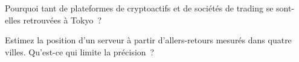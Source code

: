 \begin{interviewq}\label{iq:nw:where-the-crypto-venues-live:5}
Pourquoi tant de plateformes de cryptoactifs et de sociétés de trading se sont-elles retrouvées à Tokyo~?
\end{interviewq}

\begin{interviewq}\label{iq:nw:where-the-crypto-venues-live:6}
Estimez la position d'un serveur à partir d'allers-retours mesurés dans quatre villes. Qu'est-ce qui limite la précision~?
\end{interviewq}

